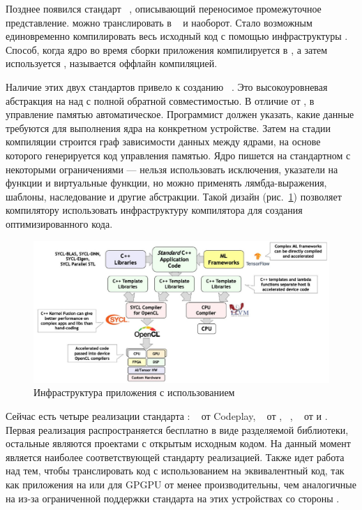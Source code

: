Позднее появился стандарт ~\cite{SPIR-V}, описывающий
переносимое промежуточное представление.
 можно транслировать в ~\cite{LLVM} и наоборот.
Стало возможным единовременно компилировать весь исходный код с помощью 
инфраструктуры .
Способ, когда ядро во время сборки приложения компилируется в
, а затем используется , 
называется оффлайн компиляцией.

Наличие этих двух стандартов привело к созданию ~\cite{SYCL}.
Это высокоуровневая абстракция на  над  с полной
обратной совместимостью.
В отличие от , в  управление памятью автоматическое.
Программист должен указать, какие данные требуются для выполнения ядра на
конкретном устройстве.
Затем на стадии компиляции строится граф зависимости данных между 
ядрами, на основе которого генерируется код управления памятью.
Ядро пишется на стандартном  с некоторыми ограничениями --- 
нельзя использовать исключения, указатели на функции и виртуальные функции, 
но можно применять лямбда-выражения, шаблоны, наследование и другие абстракции.
Такой дизайн (рис.~\ref{SYCL_infrastructure}) позволяет компилятору 
использовать инфраструктуру компилятора  для создания
оптимизированного кода.
\begin{figure}
  \centering
  \includegraphics[width=\columnwidth]{sycl.jpg}
  \caption{Инфраструктура приложения с использованием ~\cite{SYCL}}
  \label{SYCL_infrastructure}
\end{figure}

Сейчас есть четыре реализации стандарта : 
~\cite{ComputeCpp} от Codeplay,
~\cite{DPC} от ,
~\cite{hipSYCL},
~\cite{triSYCL} от  и .
Первая реализация распространяется бесплатно в виде разделяемой библиотеки,
остальные являются проектами с открытым исходным кодом.
На данный момент  является наиболее соответствующей 
стандарту реализацией.
Также идет работа над тем, чтобы транслировать код с использованием  
на эквивалентный  код, так как приложения на  или
 для GPGPU от  менее производительны, чем аналогичные 
на  из-за ограниченной поддержки стандарта  на этих 
устройствах со стороны .

